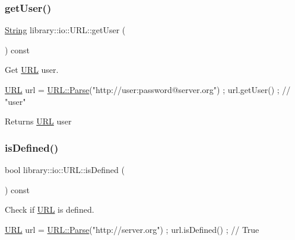 \subsubsection{\texorpdfstring{get\+User()}{getUser()}}
{\footnotesize\ttfamily \hyperlink{namespacelibrary_1_1io_a7469b45835a4421045db344d6a5a1f85}{String} library\+::io\+::\+U\+R\+L\+::get\+User (\begin{DoxyParamCaption}{ }\end{DoxyParamCaption}) const}



Get \hyperlink{classlibrary_1_1io_1_1_u_r_l}{U\+RL} user. 


\begin{DoxyCode}
\hyperlink{classlibrary_1_1io_1_1_u_r_l_a7e9c070138a6dbd000ffb10b7cd8a5c4}{URL} url = \hyperlink{classlibrary_1_1io_1_1_u_r_l_a03a589af0787df20428d4d33e26bb2d7}{URL::Parse}(\textcolor{stringliteral}{"http://user:password@server.org"}) ;
url.getUser() ; \textcolor{comment}{// "user"}
\end{DoxyCode}


\begin{DoxyReturn}{Returns}
\hyperlink{classlibrary_1_1io_1_1_u_r_l}{U\+RL} user 
\end{DoxyReturn}
\mbox{\label{classlibrary_1_1io_1_1_u_r_l_af0f1c5720acae0e2bd71404a35199546}} 
\subsubsection{\texorpdfstring{is\+Defined()}{isDefined()}}
{\footnotesize\ttfamily bool library\+::io\+::\+U\+R\+L\+::is\+Defined (\begin{DoxyParamCaption}{ }\end{DoxyParamCaption}) const}



Check if \hyperlink{classlibrary_1_1io_1_1_u_r_l}{U\+RL} is defined. 


\begin{DoxyCode}
\hyperlink{classlibrary_1_1io_1_1_u_r_l_a7e9c070138a6dbd000ffb10b7cd8a5c4}{URL} url = \hyperlink{classlibrary_1_1io_1_1_u_r_l_a03a589af0787df20428d4d33e26bb2d7}{URL::Parse}(\textcolor{stringliteral}{"http://server.org"}) ;
url.isDefined() ; \textcolor{comment}{// True}
\end{DoxyCode}


